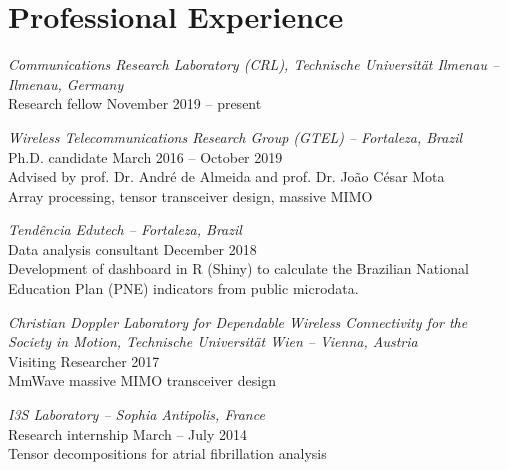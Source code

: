 \section{Professional Experience}

{\sl Communications Research Laboratory (CRL), Technische Universit\"at Ilmenau -- Ilmenau, Germany} \\
Research fellow \hfill November 2019 -- present


{\sl Wireless Telecommunications Research Group (GTEL) -- Fortaleza, Brazil}\\
Ph.D. candidate \hfill March 2016 -- October 2019 \\
Advised by prof. Dr. Andr\'e de Almeida and prof. Dr. Jo\~ao C\'esar Mota\\
Array processing, tensor transceiver design, massive MIMO

{\sl Tendência Edutech -- Fortaleza, Brazil}\\
Data analysis consultant \hfill December 2018 \\
Development of dashboard in R (Shiny) to calculate the Brazilian National Education Plan (PNE) indicators from public microdata.

{\sl Christian Doppler Laboratory for Dependable Wireless Connectivity for the Society in Motion, Technische Universit\"at Wien -- Vienna, Austria}\\
Visiting Researcher \hfill 2017 \\
MmWave massive MIMO transceiver design

{\sl I3S Laboratory -- Sophia Antipolis, France}\\
Research internship \hfill  March -- July 2014 \\
Tensor decompositions for atrial fibrillation analysis
